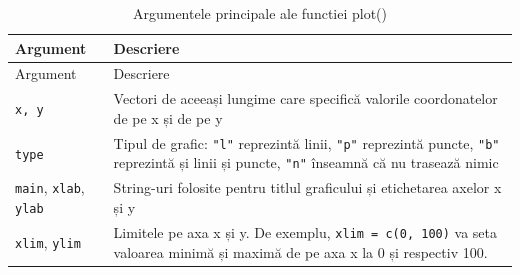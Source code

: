 \documentclass[]{article}
\begin{document}
\begin{longtable}[]{@{}ll@{}}
\caption{Argumentele principale ale functiei plot()}\tabularnewline
\toprule
\begin{minipage}[b]{0.19\columnwidth}\raggedright
Argument\strut
\end{minipage} & \begin{minipage}[b]{0.75\columnwidth}\raggedright
Descriere\strut
\end{minipage}\tabularnewline
\midrule
\endfirsthead
\toprule
\begin{minipage}[b]{0.19\columnwidth}\raggedright
Argument\strut
\end{minipage} & \begin{minipage}[b]{0.75\columnwidth}\raggedright
Descriere\strut
\end{minipage}\tabularnewline
\midrule
\endhead
\begin{minipage}[t]{0.19\columnwidth}\raggedright
\texttt{x,\ y}\strut
\end{minipage} & \begin{minipage}[t]{0.75\columnwidth}\raggedright
Vectori de aceeași lungime care specifică valorile coordonatelor de pe x
și de pe y\strut
\end{minipage}\tabularnewline
\begin{minipage}[t]{0.19\columnwidth}\raggedright
\texttt{type}\strut
\end{minipage} & \begin{minipage}[t]{0.75\columnwidth}\raggedright
Tipul de grafic: \texttt{"l"} reprezintă linii, \texttt{"p"} reprezintă
puncte, \texttt{"b"} reprezintă și linii și puncte, \texttt{"n"}
înseamnă că nu trasează nimic\strut
\end{minipage}\tabularnewline
\begin{minipage}[t]{0.19\columnwidth}\raggedright
\texttt{main}, \texttt{xlab}, \texttt{ylab}\strut
\end{minipage} & \begin{minipage}[t]{0.75\columnwidth}\raggedright
String-uri folosite pentru titlul graficului și etichetarea axelor x și
y\strut
\end{minipage}\tabularnewline
\begin{minipage}[t]{0.19\columnwidth}\raggedright
\texttt{xlim}, \texttt{ylim}\strut
\end{minipage} & \begin{minipage}[t]{0.75\columnwidth}\raggedright
Limitele pe axa x și y. De exemplu, \texttt{xlim\ =\ c(0,\ 100)} va seta
valoarea minimă și maximă de pe axa x la 0 și respectiv 100.\strut

\end{minipage}
\end{longtable}
\end{document}
